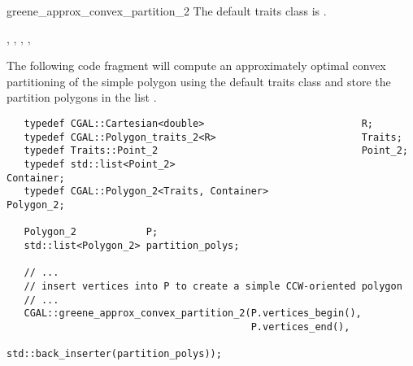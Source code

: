 \begin{ccRefFunction}{greene_approx_convex_partition_2}
The default traits class  is .

\ccSeeAlso
{},
,
,
,

\ccExample
The following code fragment will compute an approximately optimal
convex partitioning of the simple polygon  using the default
traits class and store the partition polygons in the list 
.

\begin{verbatim}
   typedef CGAL::Cartesian<double>                           R;
   typedef CGAL::Polygon_traits_2<R>                         Traits;
   typedef Traits::Point_2                                   Point_2;
   typedef std::list<Point_2>                                Container;
   typedef CGAL::Polygon_2<Traits, Container>                Polygon_2;

   Polygon_2            P;
   std::list<Polygon_2> partition_polys;

   // ...
   // insert vertices into P to create a simple CCW-oriented polygon
   // ...
   CGAL::greene_approx_convex_partition_2(P.vertices_begin(),
                                          P.vertices_end(),
                                          std::back_inserter(partition_polys));
\end{verbatim}


\end{ccRefFunction}
